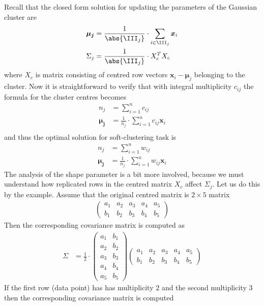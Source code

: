 \documentclass{article}
\renewcommand{\vec}[1]{\boldsymbol{#1}}
\begin{document}
Recall that the closed form solution for updating the parameters of the Gaussian cluster are
\begin{align*}
 \vec{\mu_j}&=\frac{1}{\abs{\III_j}}\cdot\sum_{i\in\III_j}\vec{x}_i\\
 \Sigma_j&= \frac{1}{\abs{\III_j}}\cdot X_c^T X_c
\end{align*}  
where $X_c$ is matrix consisting of centred row vectors $\vec{x}_i-\vec{\mu}_j$ belonging to the cluster. Now it is straightforward to verify that with integral multiplicity $c_{ij}$ the formula for the cluster centres becomes
\begin{align*}
 n_j&=\sum_{i=1}^nc_{ij}\\ 
 \vec{\mu_j}&=\frac{1}{n_j}\cdot\sum_{i=1}^n c_{ij}\vec{x}_i\\
\end{align*}  
and thus the optimal solution for soft-clustering task is
\begin{align*}
 n_j&=\sum_{i=1}^nw_{ij}\\ 
 \vec{\mu_j}&=\frac{1}{n_j}\cdot\sum_{i=1}^n w_{ij}\vec{x}_i
\end{align*}  
The analysis of the shape parameter is a bit more involved, because we must understand how replicated rows in the centred matrix $X_c$ affect $\Sigma_j$. Let us do this by the example. Assume that the original centred matrix is $2\times 5$ matrix
\begin{align*}
\begin{pmatrix}
a_1 & a_2 & a_3 & a_4 & a_5\\
b_1 & b_2 & b_3 & b_4 & b_5
\end{pmatrix}
\end{align*} 
Then the corresponding covariance matrix is computed as
\begin{align*}
\Sigma&=
\frac{1}{2}\cdot
\begin{pmatrix}
a_1 & b_1\\ 
a_2 & b_2\\
a_3 & b_3\\
a_4 & b_4\\ 
a_5 & b_5
\end{pmatrix}
\begin{pmatrix}
a_1 & a_2 & a_3 & a_4 & a_5\\
b_1 & b_2 & b_3 & b_4 & b_5
\end{pmatrix}
\end{align*}
If the first row (data point) has has multiplicity $2$ and the second multiplicity $3$
then the corresponding covariance matrix is computed
\end{document}
